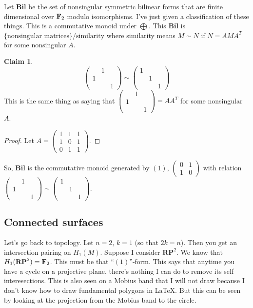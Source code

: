 \documentclass{amsart}
\theoremstyle{theorem}
\theoremstyle{definition}
\newtheorem{claim}[theorem]{Claim}
\newcommand{\RP}{\mathbf{RP}}
\begin{document}
Let $\mathbf{Bil}$ be the set of nonsingular symmetric bilinear forms that are finite dimensional over $\mathbf F_2$ modulo isomorphisms. I've just given a classification of these things. This is a commutative monoid under $\bigoplus$. This $\mathbf{Bil}$ is $\{\text{nonsingular matrices}\}/\text{similarity}$ where similarity means $M\sim N$ if $N=AMA^T$ for some nonsingular $A$.
\begin{claim}
\begin{equation*}
\begin{pmatrix}
 & 1 & \\
1 & & \\
 & & 1
\end{pmatrix}
\sim
\begin{pmatrix}
1 & & \\
& 1 & \\
& & 1
\end{pmatrix}
\end{equation*}
This is the same thing as saying that $\begin{pmatrix}
 & 1 & \\
1 & & \\
 & & 1
\end{pmatrix}=AA^T$ for some nonsingular $A$.
\end{claim}
\begin{proof}
Let $A=\begin{pmatrix}1 & 1 & 1 \\ 1 & 0 & 1 \\ 0 & 1 & 1 \end{pmatrix}$.
\end{proof}
So, $\mathbf{Bil}$ is the commutative monoid generated by $(1)$, $\begin{pmatrix}0 & 1 \\ 1 & 0\end{pmatrix}$ with relation $\begin{pmatrix}
 & 1 & \\
1 & & \\
 & & 1
\end{pmatrix}
\sim
\begin{pmatrix}
1 & & \\
& 1 & \\
& & 1
\end{pmatrix}$.
\subsection{Connected surfaces}
Let's go back to topology. Let $n=2$, $k=1$ (so that $2k=n$). Then you get an intersection pairing on $ H_1(M)$. Suppose I consider $\RP^2$. We know that $ H_1(\RP^2)=\FF_2$. This must be that ``$(1)$''-form. This says that anytime you have a cycle on a projective plane, there's nothing I can do to remove its self interesections. This is also seen on a Mobius band that I will not draw because I don't know how to draw fundamental polygons in LaTeX. But this can be seen by looking at the projection from the Mobius band to the circle.
\end{document}
